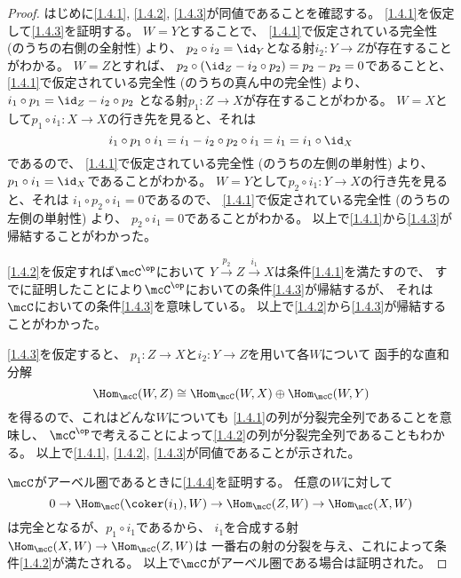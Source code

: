 \documentclass[uplatex,dvipdfmx]{jsarticle}
\begin{document}
\begin{proof}
  はじめに\ref{1.4.1}, \ref{1.4.2}, \ref{1.4.3}が同値であることを確認する。
  \ref{1.4.1}を仮定して\ref{1.4.3}を証明する。
  \(W=Y\)とすることで、
  \ref{1.4.1}で仮定されている完全性 (のうちの右側の全射性) より、
  \(p_2\circ i_2 = \id_Y\)となる射\(i_2:Y\to Z\)が存在することがわかる。
  \(W=Z\)とすれば、
  \(p_2\circ (\id_Z - i_2\circ p_2) = p_2 - p_2 = 0\)であることと、
  \ref{1.4.1}で仮定されている完全性 (のうちの真ん中の完全性) より、
  \(i_1\circ p_1 = \id_Z - i_2\circ p_2\)
  となる射\(p_1:Z\to X\)が存在することがわかる。
  \(W=X\)として\(p_1\circ i_1 :X\to X\)の行き先を見ると、それは
  \[
  i_1\circ p_1 \circ i_1
  = i_1 - i_2\circ p_2 \circ i_1 = i_1 = i_1 \circ \id_X
  \]
  であるので、
  \ref{1.4.1}で仮定されている完全性 (のうちの左側の単射性) より、
  \(p_1\circ i_1 = \id_X\)であることがわかる。
  \(W=Y\)として\(p_2\circ i_1 : Y\to X\)の行き先を見ると、それは
  \(i_1\circ p_2\circ i_1 = 0\)であるので、
  \ref{1.4.1}で仮定されている完全性 (のうちの左側の単射性) より、
  \(p_2\circ i_1 = 0\)であることがわかる。
  以上で\ref{1.4.1}から\ref{1.4.3}が帰結することがわかった。

  \ref{1.4.2}を仮定すれば\(\mcC^{\op}\)において
  \(Y\xrightarrow{p_2}Z \xrightarrow{i_1}X\)は条件\ref{1.4.1}を満たすので、
  すでに証明したことにより\(\mcC^{\op}\)においての条件\ref{1.4.3}が帰結するが、
  それは\(\mcC\)においての条件\ref{1.4.3}を意味している。
  以上で\ref{1.4.2}から\ref{1.4.3}が帰結することがわかった。

  \ref{1.4.3}を仮定すると、
  \(p_1:Z\to X\)と\(i_2:Y\to Z\)を用いて各\(W\)について
  函手的な直和分解
  \[
  \Hom_{\mcC}(W,Z) \cong \Hom_{\mcC}(W,X)\oplus \Hom_{\mcC}(W,Y)
  \]
  を得るので、これはどんな\(W\)についても
  \ref{1.4.1}の列が分裂完全列であることを意味し、
  \(\mcC^{\op}\)で考えることによって\ref{1.4.2}の列が分裂完全列であることもわかる。
  以上で\ref{1.4.1}, \ref{1.4.2}, \ref{1.4.3}が同値であることが示された。

  \(\mcC\)がアーベル圏であるときに\ref{1.4.4}を証明する。
  任意の\(W\)に対して
  \[
  0\to \Hom_{\mcC}(\coker(i_1),W) \to \Hom_{\mcC}(Z,W) \to \Hom_{\mcC}(X,W)
  \]
  は完全となるが、\(p_1\circ i_1\)であるから、
  \(i_1\)を合成する射\(\Hom_{\mcC}(X,W) \to \Hom_{\mcC}(Z,W)\)は
  一番右の射の分裂を与え、これによって条件\ref{1.4.2}が満たされる。
  以上で\(\mcC\)がアーベル圏である場合は証明された。


\end{proof}
\end{document}
